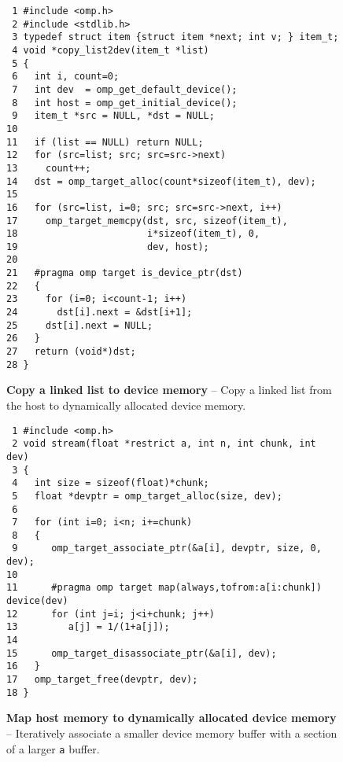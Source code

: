 \begin{figure*}[!tb]
\begin{verbatim}
 1 #include <omp.h>
 2 #include <stdlib.h>
 3 typedef struct item {struct item *next; int v; } item_t;
 4 void *copy_list2dev(item_t *list)
 5 {
 6   int i, count=0;
 7   int dev  = omp_get_default_device();
 8   int host = omp_get_initial_device();
 9   item_t *src = NULL, *dst = NULL;
10 
11   if (list == NULL) return NULL;
12   for (src=list; src; src=src->next)
13     count++;
14   dst = omp_target_alloc(count*sizeof(item_t), dev);
15   
16   for (src=list, i=0; src; src=src->next, i++)
17     omp_target_memcpy(dst, src, sizeof(item_t),
18                       i*sizeof(item_t), 0,
19                       dev, host);
20                       
21   #pragma omp target is_device_ptr(dst)
22   {
23     for (i=0; i<count-1; i++)
24       dst[i].next = &dst[i+1];
25     dst[i].next = NULL;
26   } 
27   return (void*)dst;
28 } 
\end{verbatim}
\caption{ \textbf {Copy a linked list to device memory} -- \small
          Copy a linked list from the host to dynamically allocated
          device memory.
         }
\label{figure:chapter6-alloc}
\end{figure*}


\begin{figure*}[!tb]
\begin{verbatim}
 1 #include <omp.h>
 2 void stream(float *restrict a, int n, int chunk, int dev)
 3 {
 4   int size = sizeof(float)*chunk;
 5   float *devptr = omp_target_alloc(size, dev);
 6 
 7   for (int i=0; i<n; i+=chunk)
 8   {
 9      omp_target_associate_ptr(&a[i], devptr, size, 0, dev);
10 
11      #pragma omp target map(always,tofrom:a[i:chunk]) device(dev)
12      for (int j=i; j<i+chunk; j++)
13         a[j] = 1/(1+a[j]);
14 
15      omp_target_disassociate_ptr(&a[i], dev);
16   }
17   omp_target_free(devptr, dev);
18 }
\end{verbatim}
\caption{ \textbf {Map host memory to dynamically allocated device memory} -- \small
          Iteratively associate a smaller device memory buffer with a section
          of a larger \texttt{a} buffer.
         }
\label{figure:chapter6-assoc}
\end{figure*}


